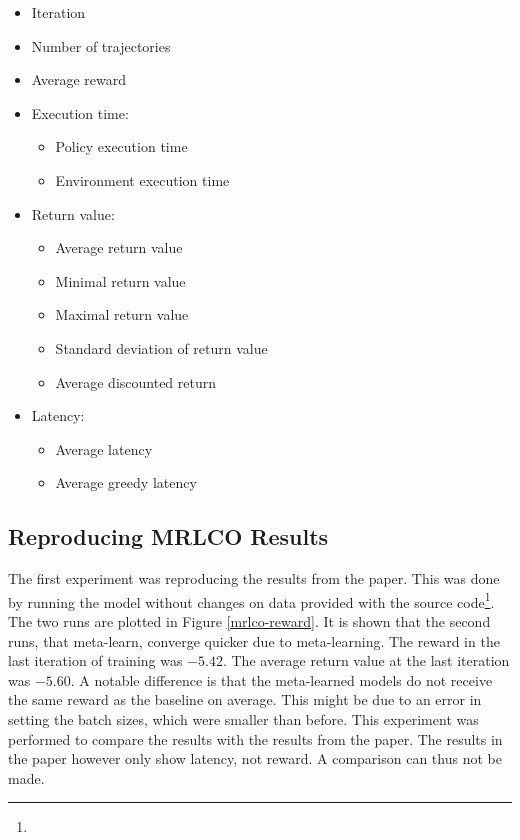 \begin{itemize}[noitemsep]
    \item Iteration
    \item Number of trajectories
    \item Average reward
    \item Execution time:
        \begin{itemize}[noitemsep]
            \item Policy execution time
            \item Environment execution time
        \end{itemize}
    \item Return value:
        \begin{itemize}[noitemsep]
            \item Average return value
            \item Minimal return value
            \item Maximal return value
            \item Standard deviation of return value
            \item Average discounted return
        \end{itemize}
    \item Latency:
        \begin{itemize}[noitemsep]
            \item Average latency
            \item Average greedy latency
        \end{itemize}
\end{itemize}




\subsection{Reproducing MRLCO Results}



The first experiment was reproducing the results from the paper. This was done
by running the \mrlco model without changes on data provided with the source
code\footnote{\urlmetadata}. The two runs are plotted in Figure
\ref{mrlco-reward}. It is shown that the second runs, that meta-learn,
converge quicker due to meta-learning. The reward in the last iteration of
training was $-5.42$. The average return value at the last iteration was
$-5.60$. A notable difference is that the meta-learned models do not receive
the same reward as the baseline on average. This might be due to an error in
setting the batch sizes, which were smaller than before. This experiment was
performed to compare the results with the results from the paper. The results
in the paper however only show latency, not reward. A comparison can thus not
be made.

